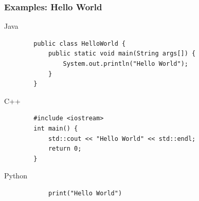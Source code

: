 \documentclass[10pt, a4paper]{beamer} %
\begin{document}
\begin{frame}[fragile,c]\frametitle{Examples: Hello World}
    \begin{block}{Java}
    \begin{lstlisting}
        public class HelloWorld {
            public static void main(String args[]) {
                System.out.println("Hello World");
            }
        }
    \end{lstlisting}    
    \end{block}
    
    \begin{block}{C++}
    \begin{lstlisting}
        #include <iostream>
        int main() {
            std::cout << "Hello World" << std::endl;
            return 0;
        }
    \end{lstlisting}    
    \end{block}
    
    \begin{block}{Python}
        \begin{lstlisting}
            print("Hello World")
        \end{lstlisting}
    \end{block}
    
\end{frame}
\end{document}
